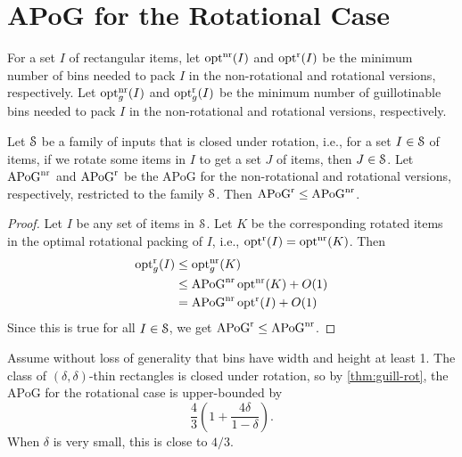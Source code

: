 \section{APoG for the Rotational Case}
\label{sec:guill-rot}

\begin{theorem}
\label{thm:guill-rot}
For a set $I$ of rectangular items,
let $\operatorname{opt}^{\mathrm{nr}}(I)$ and $\operatorname{opt}^{\mathrm{r}}(I)$ be the minimum number of bins
needed to pack $I$ in the non-rotational and rotational versions, respectively.
Let $\operatorname{opt}^{\mathrm{nr}}_g(I)$ and $\operatorname{opt}^{\mathrm{r}}_g(I)$ be the minimum number of guillotinable bins
needed to pack $I$ in the non-rotational and rotational versions, respectively.

Let $\mathcal{S}$ be a family of inputs that is closed under rotation, i.e.,
for a set $I \in \mathcal{S}$ of items, if we rotate some items in $I$ to get a set $J$ of items,
then $J \in \mathcal{S}$.
Let $\mathrm{APoG}^{\mathrm{nr}}$ and $\mathrm{APoG}^{\mathrm{r}}$ be the APoG for the non-rotational
and rotational versions, respectively, restricted to the family $\mathcal{S}$.
Then $\mathrm{APoG}^{\mathrm{r}} \le \mathrm{APoG}^{\mathrm{nr}}$.
\end{theorem}
\begin{proof}
Let $I$ be any set of items in $\mathcal{S}$. Let $K$ be the corresponding rotated items
in the optimal rotational packing of $I$, i.e., $\operatorname{opt}^{\mathrm{r}}(I) = \operatorname{opt}^{\mathrm{nr}}(K)$. Then
\begin{align*}
\operatorname{opt}^{\mathrm{r}}_g(I) &\le \operatorname{opt}^{\mathrm{nr}}_g(K)
\\ &\le \mathrm{APoG}^{\mathrm{nr}}\operatorname{opt}^{\mathrm{nr}}(K) + O(1)
\\ &= \mathrm{APoG}^{\mathrm{nr}}\operatorname{opt}^{\mathrm{r}}(I) + O(1)
\end{align*}
Since this is true for all $I \in \mathcal{S}$, we get $\mathrm{APoG}^{\mathrm{r}} \le \mathrm{APoG}^{\mathrm{nr}}$.
\end{proof}

Assume without loss of generality that bins have width and height at least 1.
The class of $(\delta, \delta)$-thin rectangles is closed under rotation,
so by \cref{thm:guill-rot}, the APoG for the rotational case is upper-bounded by
\[ \frac{4}{3}\left(1+\frac{4\delta}{1-\delta}\right). \]
When $\delta$ is very small, this is close to $4/3$.
